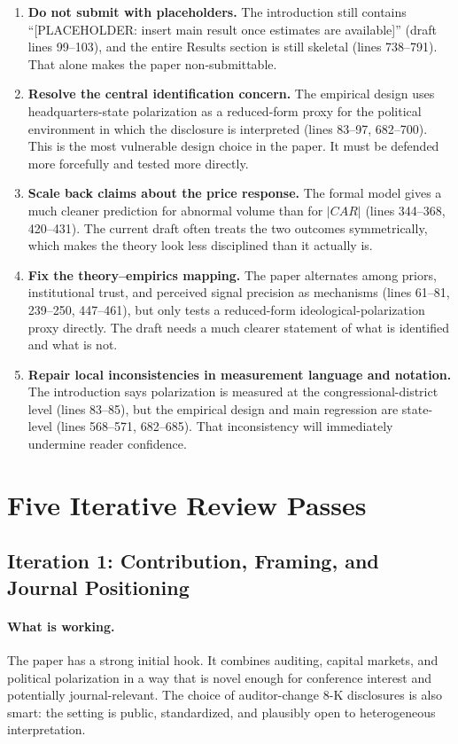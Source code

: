 \documentclass[12pt]{article}
\begin{document}
\begin{enumerate}
    \item \textbf{Do not submit with placeholders.} The introduction still contains ``[PLACEHOLDER: insert main result once estimates are available]'' (draft lines 99--103), and the entire Results section is still skeletal (lines 738--791). That alone makes the paper non-submittable.
    \item \textbf{Resolve the central identification concern.} The empirical design uses headquarters-state polarization as a reduced-form proxy for the political environment in which the disclosure is interpreted (lines 83--97, 682--700). This is the most vulnerable design choice in the paper. It must be defended more forcefully and tested more directly.
    \item \textbf{Scale back claims about the price response.} The formal model gives a much cleaner prediction for abnormal volume than for $|CAR|$ (lines 344--368, 420--431). The current draft often treats the two outcomes symmetrically, which makes the theory look less disciplined than it actually is.
    \item \textbf{Fix the theory--empirics mapping.} The paper alternates among priors, institutional trust, and perceived signal precision as mechanisms (lines 61--81, 239--250, 447--461), but only tests a reduced-form ideological-polarization proxy directly. The draft needs a much clearer statement of what is identified and what is not.
    \item \textbf{Repair local inconsistencies in measurement language and notation.} The introduction says polarization is measured at the congressional-district level (lines 83--85), but the empirical design and main regression are state-level (lines 568--571, 682--685). That inconsistency will immediately undermine reader confidence.
\end{enumerate}

\section*{Five Iterative Review Passes}

\subsection*{Iteration 1: Contribution, Framing, and Journal Positioning}

\paragraph{What is working.}
The paper has a strong initial hook. It combines auditing, capital markets, and political polarization in a way that is novel enough for conference interest and potentially journal-relevant. The choice of auditor-change 8-K disclosures is also smart: the setting is public, standardized, and plausibly open to heterogeneous interpretation.
\end{document}
